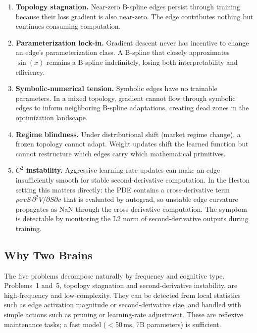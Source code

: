 \documentclass[11pt,a4paper]{article}
\begin{document}
\begin{enumerate}[nosep]
  \item \textbf{Topology stagnation.} Near-zero B-spline edges persist through training
  because their loss gradient is also near-zero. The edge contributes nothing but
  continues consuming computation.

  \item \textbf{Parameterization lock-in.} Gradient descent never has incentive to
  change an edge's parameterization class. A B-spline that closely approximates
  $\sin(x)$ remains a B-spline indefinitely, losing both interpretability and
  efficiency.

  \item \textbf{Symbolic-numerical tension.} Symbolic edges have no trainable
  parameters. In a mixed topology, gradient cannot flow through symbolic edges to
  inform neighboring B-spline adaptations, creating dead zones in the optimization
  landscape.

  \item \textbf{Regime blindness.} Under distributional shift (market regime change),
  a frozen topology cannot adapt. Weight updates shift the learned function but cannot
  restructure which edges carry which mathematical primitives.

  \item \textbf{$C^2$ instability.} Aggressive learning-rate updates can make an edge
  insufficiently smooth for stable second-derivative computation. In the Heston
  setting this matters directly: the PDE contains a cross-derivative term
  $\rho\sigma vS\,\partial^2 V/\partial S\partial v$ that is evaluated by autograd,
  so unstable edge curvature propagates as NaN through the cross-derivative
  computation. The symptom is detectable by monitoring the L2 norm of second-derivative
  outputs during training.
\end{enumerate}

\subsection{Why Two Brains}
\label{sec:intro:twobrains}

The five problems decompose naturally by frequency and cognitive type. Problems~1
and~5, topology stagnation and second-derivative instability, are high-frequency and
low-complexity. They can be detected from local statistics such as edge activation
magnitude or second-derivative size, and handled with simple actions such as pruning
or learning-rate adjustment. These are reflexive maintenance tasks; a fast model
($<$50\,ms, 7B parameters) is sufficient.
\end{document}
